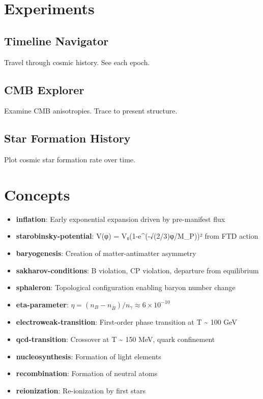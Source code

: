 \documentclass[
  11pt,
  letterpaper,
  twoside,
  openright]{book}
\providecommand{\tightlist}{%
  \setlength{\itemsep}{0pt}\setlength{\parskip}{0pt}}
\begin{document}
\section{Experiments}\label{experiments-32}

\subsection{Timeline Navigator}\label{timeline-navigator}

Travel through cosmic history. See each epoch.

\subsection{CMB Explorer}\label{cmb-explorer}

Examine CMB anisotropies. Trace to present structure.

\subsection{Star Formation History}\label{star-formation-history}

Plot cosmic star formation rate over time.

\section{Concepts}\label{concepts-31}

\begin{itemize}
\tightlist
\item
  \textbf{inflation}: Early exponential expansion driven by pre-manifest
  flux
\item
  \textbf{starobinsky-potential}: V(φ) = V₀(1-e\^{}(-√(2/3)φ/M\_P))²
  from FTD action
\item
  \textbf{baryogenesis}: Creation of matter-antimatter asymmetry
\item
  \textbf{sakharov-conditions}: B violation, CP violation, departure
  from equilibrium
\item
  \textbf{sphaleron}: Topological configuration enabling baryon number
  change
\item
  \textbf{eta-parameter}:
  \(\eta = (n_B - n_{\bar{B}})/n_\gamma \approx 6 \times 10^{-10}\)
\item
  \textbf{electroweak-transition}: First-order phase transition at T
  \textasciitilde{} 100 GeV
\item
  \textbf{qcd-transition}: Crossover at T \textasciitilde{} 150 MeV,
  quark confinement
\item
  \textbf{nucleosynthesis}: Formation of light elements
\item
  \textbf{recombination}: Formation of neutral atoms
\item
  \textbf{reionization}: Re-ionization by first stars
\end{itemize}
\end{document}
